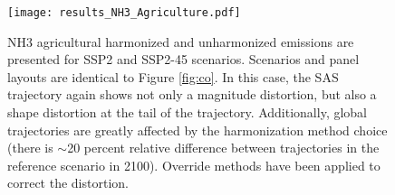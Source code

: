 \begin{figure}
  \begin{center}
    \texttt{[image: results\_NH3\_Agriculture.pdf]}
    \caption[]{
      \label{fig:nh3}
      NH3 agricultural harmonized and unharmonized emissions are presented for
      SSP2 and SSP2-45 scenarios. Scenarios and panel layouts are identical to
      Figure \ref{fig:co}. In this case, the SAS trajectory again shows not only
      a magnitude distortion, but also a shape distortion at the tail of the
      trajectory. Additionally, global trajectories are greatly affected by the
      harmonization method choice (there is $\sim$20 percent relative difference
      between trajectories in the reference scenario in 2100). Override methods
      have been applied to correct the distortion.  }
  \end{center}
\end{figure}




